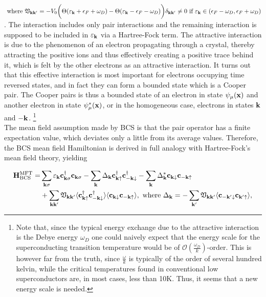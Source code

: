 $\textnormal{ where } {\mathfrak{V}}_{{\bf k}{\bf k}'} = -V_0 \bigg(\Theta(\varepsilon_{\bf k} + \epsilon_F + \omega_D) - \Theta(\varepsilon_{\bf k} - \epsilon_F - \omega_D)\bigg) \delta_{{\bf k}{\bf k}'} \neq 0 \textnormal{ if }\varepsilon_{{\bf k}} \in (\epsilon_F - \omega_D, \epsilon_F + \omega_D)$. The interaction includes only pair interactions and the remaining interaction is supposed to be included in $\varepsilon_{{\bf k}}$ via a Hartree-Fock term. The attractive interaction is due to the phenomenon of an electron propagating through a crystal, thereby attracting the positive ions and thus effectively creating a positive trace behind it, which is felt by the other electrons as an attractive interaction. It turns out that this effective interaction is most important for electrons occupying time reversed states, and in fact they can form a bounded state which is a Cooper pair. The Cooper pairs is thus a bounded state of an electron in state $\psi_{\mu}({\bf x})$ and another electron in state $\psi_{\mu}^*({\bf x})$, or in the homogeneous case, electrons in states ${\bf k}$ and ${\bf -k}$. \footnote{Note that, since the typical energy exchange due to the attractive interaction is the Debye energy $\omega_D$ one could naively expect that the energy scale for the superconducting transition temperature would be of $\mathcal{O}(\frac{\omega_D}{k})$-order. This is however far from the truth, since $\frac{\omega}{k}$ is typically of the order of several hundred kelvin, while the critical temperatures found in conventional low superconductors are, in most cases, less than 10K. Thus, it seems that a new energy scale is needed. }\\ 

The mean field assumption made by BCS is that the pair operator has a finite expectation value, which deviates only a little from its average values. Therefore, the BCS mean field Hamiltonian is derived in full analogy with Hartree-Fock's mean field theory, yielding

\begin{equation}
    \begin{split}
        {\bf H}_{\textnormal{BCS}}^{\textnormal{MFT}} =& \sum_{{\bf k} \sigma} \varepsilon_{{\bf k}} {\bf c}_{{\bf k} \sigma}^\dagger {\bf c}_{{\bf k} \sigma} - \sum_{{\bf k}} \Delta_{{\bf k}} {\bf c}_{{\bf k} \uparrow}^\dagger {\bf c}_{-{\bf k} \downarrow}^\dagger - \sum_{{\bf k}} \Delta^*_{{\bf k}} {\bf c}_{{\bf k} \downarrow} {\bf c}_{-{\bf k} \uparrow} \\
        &+ \sum_{{\bf k}{\bf k}'} \mathfrak{V}_{{\bf k}{\bf k}'} \langle {\bf c}_{{\bf k} \uparrow}^\dagger {\bf c}_{-{\bf k} \downarrow}^\dagger \rangle \langle {\bf c}_{{\bf k} \downarrow} {\bf c}_{-{\bf k} \uparrow} \rangle, \textnormal{ where } \Delta_{{\bf k}} = - \sum_{{\bf k'}} \mathfrak{V}_{{\bf k} {\bf k'}} \langle  {\bf c}_{-{\bf k}' \downarrow} {\bf c}_{{\bf k}' \uparrow} \rangle,
        \label{BCS hamiltonian}
    \end{split}
\end{equation}

